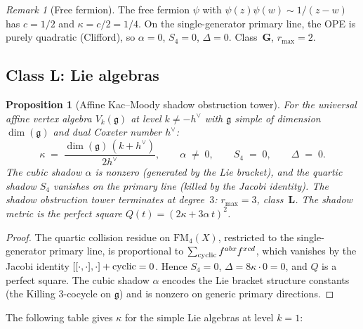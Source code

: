 \documentclass[11pt]{article}
\theoremstyle{plain}
\newtheorem{proposition}[theorem]{Proposition}
\theoremstyle{definition}
\theoremstyle{remark}
\newtheorem{remark}[theorem]{Remark}
\newcommand{\fg}{\mathfrak{g}}
\newcommand{\FM}{\mathrm{FM}}
\begin{document}
\begin{remark}[Free fermion]
\label{rem:free-fermion}
The free fermion $\psi$ with $\psi(z)\psi(w) \sim
1/(z-w)$ has $c = 1/2$ and $\kappa = c/2 = 1/4$.
On the single-generator primary line, the OPE is
purely quadratic (Clifford), so $\alpha = 0$, $S_4 = 0$,
$\Delta = 0$. Class~$\mathbf{G}$, $r_{\max} = 2$.
\end{remark}

\subsection{Class L: Lie algebras}
\label{subsec:class-L}

\begin{proposition}[Affine Kac--Moody shadow obstruction tower]
\label{prop:affine-shadow}
For the universal affine vertex algebra $V_k(\fg)$ at
level $k \neq -h^\vee$ with $\fg$ simple of
dimension $\dim(\fg)$ and dual Coxeter number $h^\vee$:
\[
 \kappa
 \;=\;
 \frac{\dim(\fg)\,(k + h^\vee)}{2h^\vee},
 \qquad
 \alpha \;\neq\; 0,
 \qquad
 S_4 \;=\; 0,
 \qquad
 \Delta \;=\; 0.
\]
The cubic shadow $\alpha$ is nonzero (generated by the
Lie bracket), and the quartic shadow $S_4$ vanishes on
the primary line (killed by the Jacobi identity).
The shadow obstruction tower terminates at degree~$3$:
$r_{\max} = 3$, class~$\mathbf{L}$.
The shadow metric is the perfect square
$Q(t) = (2\kappa + 3\alpha\,t)^2$.
\end{proposition}

\begin{proof}
The quartic collision residue on $\FM_4(X)$, restricted
to the single-generator primary line, is proportional to
$\sum_{\textup{cyclic}} f^{abx}f^{xcd}$,
which vanishes by the Jacobi identity
$[[\cdot,\cdot],\cdot] + \textup{cyclic} = 0$.
Hence $S_4 = 0$, $\Delta = 8\kappa \cdot 0 = 0$, and
$Q$ is a perfect square.
The cubic shadow $\alpha$ encodes the Lie bracket
structure constants (the Killing $3$-cocycle on $\fg$)
and is nonzero on generic primary directions.
\end{proof}

The following table gives $\kappa$ for the simple Lie
algebras at level $k = 1$:
\end{document}
